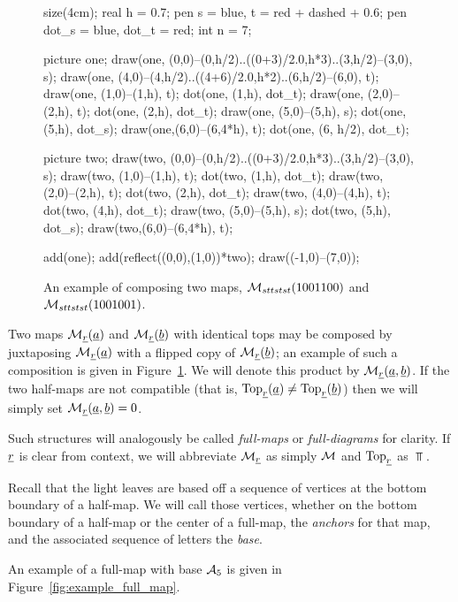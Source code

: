 \begin{figure}[ht]
	\centering
	\begin{asy}
	size(4cm);
	real h = 0.7;
	pen s = blue, t = red + dashed + 0.6;
	pen dot_s = blue, dot_t = red;
	int n = 7;

	picture one;
	draw(one, (0,0)--(0,h/2)..((0+3)/2.0,h*3)..(3,h/2)--(3,0), s);
	draw(one, (4,0)--(4,h/2)..((4+6)/2.0,h*2)..(6,h/2)--(6,0), t);
	draw(one, (1,0)--(1,h), t);
	dot(one, (1,h), dot_t);
	draw(one, (2,0)--(2,h), t);
	dot(one, (2,h), dot_t);
	draw(one, (5,0)--(5,h), s);
	dot(one, (5,h), dot_s);
	draw(one,(6,0)--(6,4*h), t);
	dot(one, (6, h/2), dot_t);

	picture two;
	draw(two, (0,0)--(0,h/2)..((0+3)/2.0,h*3)..(3,h/2)--(3,0), s);
	draw(two, (1,0)--(1,h), t);
	dot(two, (1,h), dot_t);
	draw(two, (2,0)--(2,h), t);
	dot(two, (2,h), dot_t);
	draw(two, (4,0)--(4,h), t);
	dot(two, (4,h), dot_t);
	draw(two, (5,0)--(5,h), s);
	dot(two, (5,h), dot_s);
	draw(two,(6,0)--(6,4*h), t);

	add(one); add(reflect((0,0),(1,0))*two);
	draw((-1,0)--(7,0));
	\end{asy}
	\caption{An example of composing two maps, $\MM_{sttstst}(1001100)$ and $\MM_{sttstst}(1001001)$.}
	\label{fig:example_compose}
\end{figure}

Two maps $\MM_{\ul r}(\ul a)$ and $\MM_{\ul r}(\ul b)$ with identical tops may be composed by juxtaposing $\MM_{\ul r}(\ul a)$ with a flipped copy of $\MM_{\ul r}(\ul b)$; an example of such a composition is given in Figure~\ref{fig:example_compose}.  We will denote this product by $\MM_{\ul r}(\ul a, \ul b)$.  If the two half-maps are not compatible (that is, $\Top_{\ul r}(\ul a) \neq \Top_{\ul r}(\ul b)$) then we will simply set $\MM_{\ul r}(\ul a, \ul b) = 0$.

Such structures will analogously be called \emph{full-maps} or \emph{full-diagrams} for clarity.  If $\ul r$ is clear from context, we will abbreviate $\MM_{\ul r}$ as simply $\MM$ and $\Top_{\ul r}$ as $\Top$.

Recall that the light leaves are based off a sequence of vertices at the bottom boundary of a half-map.  We will call those vertices, whether on the bottom boundary of a half-map or the center of a full-map, the \emph{anchors} for that map, and the associated sequence of letters the \emph{base}.  

An example of a full-map with base $\AA_5$ is given in Figure~\ref{fig:example_full_map}.

